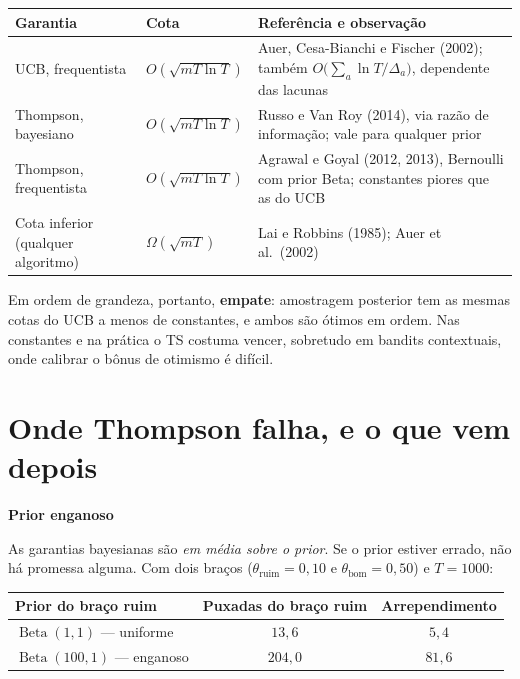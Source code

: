 \documentclass[11pt, a4paper]{article}
\newcommand{\Bdist}{\operatorname{Beta}}
\newcommand{\subt}[1]{\medskip\noindent\textbf{\color{rlAzulClaro}#1}\par\nobreak\smallskip}
\begin{document}
\begin{center}\small
\begin{tabular}{@{}llp{6.4cm}@{}}
\toprule
\textbf{Garantia} & \textbf{Cota} & \textbf{Referência e observação} \\
\midrule
UCB, frequentista & $O(\sqrt{mT\ln T})$ &
  Auer, Cesa-Bianchi e Fischer (2002); também
  $O\big(\sum_a \ln T/\Delta_a\big)$, dependente das lacunas \\
Thompson, bayesiano & $O(\sqrt{mT\ln T})$ &
  Russo e Van Roy (2014), via razão de informação; vale para qualquer prior \\
Thompson, frequentista & $O(\sqrt{mT\ln T})$ &
  Agrawal e Goyal (2012, 2013), Bernoulli com prior Beta; constantes piores
  que as do UCB \\
Cota inferior (qualquer algoritmo) & $\Omega(\sqrt{mT})$ &
  Lai e Robbins (1985); Auer et al.\ (2002) \\
\bottomrule
\end{tabular}
\end{center}

\medskip
\noindent
Em ordem de grandeza, portanto, \textbf{empate}: amostragem posterior tem as
mesmas cotas do UCB a menos de constantes, e ambos são ótimos em ordem. Nas
constantes e na prática o TS costuma vencer, sobretudo em bandits contextuais,
onde calibrar o bônus de otimismo é difícil.

\section{Onde Thompson falha, e o que vem depois}

\subt{Prior enganoso}
As garantias bayesianas são \emph{em média sobre o prior}. Se o prior estiver
errado, não há promessa alguma. Com dois braços ($\theta_{\text{ruim}} = 0{,}10$
e $\theta_{\text{bom}} = 0{,}50$) e $T = 1000$:

\begin{center}\small
\begin{tabular}{@{}lcc@{}}
\toprule
\textbf{Prior do braço ruim} & \textbf{Puxadas do braço ruim} & \textbf{Arrependimento} \\
\midrule
$\Bdist(1,1)$ — uniforme   & $13{,}6$  & $5{,}4$ \\
$\Bdist(100,1)$ — enganoso & $204{,}0$ & $81{,}6$ \\
\bottomrule
\end{tabular}
\end{center}
\end{document}
